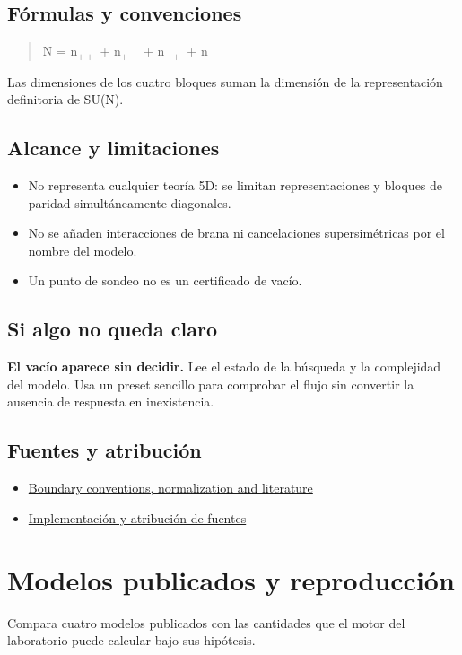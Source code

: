 \documentclass[11pt,a4paper]{article}
\begin{document}
\subsection*{Fórmulas y convenciones}
\begin{quote}N = n\ensuremath{{}_{++}} + n\ensuremath{{}_{+-}} + n\ensuremath{{}_{-+}} + n\ensuremath{{}_{--}}\end{quote}
Las dimensiones de los cuatro bloques suman la dimensión de la representación definitoria de SU(N).

\subsection*{Alcance y limitaciones}
\begin{itemize}
\item No representa cualquier teoría 5D: se limitan representaciones y bloques de paridad simultáneamente diagonales.
\item No se añaden interacciones de brana ni cancelaciones supersimétricas por el nombre del modelo.
\item Un punto de sondeo no es un certificado de vacío.
\end{itemize}
\subsection*{Si algo no queda claro}
\textbf{El vacío aparece sin decidir.} Lee el estado de la búsqueda y la complejidad del modelo. Usa un preset sencillo para comprobar el flujo sin convertir la ausencia de respuesta en inexistencia.

\subsection*{Fuentes y atribución}
\begin{itemize}
\item \href{https://karlesmarin.github.io/ghu-explorer/docs/index.html}{Boundary conventions, normalization and literature}
\item \href{https://github.com/karlesmarin/ghu-lab/blob/main/src/sections/sun5d_section.js}{Implementación y atribución de fuentes}
\end{itemize}
\section{Modelos publicados y reproducción}
Compara cuatro modelos publicados con las cantidades que el motor del laboratorio puede calcular bajo sus hipótesis.
\end{document}
